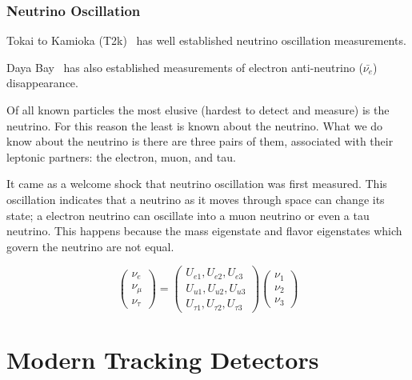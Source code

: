

\subsubsection{Neutrino Oscillation}

Tokai to Kamioka (T2k)~\citep{PhysRevD.91.072010_t2k_2015} has well established neutrino oscillation measurements.

Daya Bay~\citep{daya_bay_2012_neutrino_PhysRevLett.108.171803} has also established measurements of electron anti-neutrino ($\bar{\nu_{e}}$) disappearance.

Of all known particles the most elusive (hardest to detect and measure) is the neutrino.
For this reason the least is known about the neutrino.
What we do know about the neutrino is there are three pairs of them, associated with their leptonic partners: the electron, muon, and tau.

It came as a welcome shock that neutrino oscillation was first measured.
This oscillation indicates that a neutrino as it moves through space can change its state; a electron neutrino can oscillate into a muon neutrino or even a tau neutrino.
This happens because the mass eigenstate and flavor eigenstates which govern the neutrino are not equal.

\begin{equation}
\begin{pmatrix}
\nu_e\\
\nu_{\mu}\\
\nu_{\tau}
\end{pmatrix}
=
\begin{pmatrix}
U_{e1}, U_{e2}, U_{e3} \\
U_{u1}, U_{u2}, U_{u3} \\
U_{\tau1}, U_{\tau2}, U_{\tau3}
\end{pmatrix}
\begin{pmatrix}
\nu_1\\
\nu_2\\
\nu_3
\end{pmatrix}
\end{equation}


\section{Modern Tracking Detectors}

